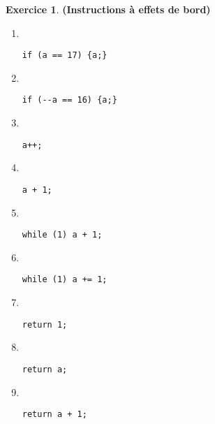 \documentclass[12pt]{article}
\theoremstyle{definition}
\newtheorem{Exercice}{Exercice}
\begin{document}
\begin{Exercice} {\bf (Instructions à effets de bord)}
\begin{enumerate}
\begin{multicols}{2}
\begin{enumerate}
            \item ~
\begin{lstlisting}
if (a == 17) {a;}
\end{lstlisting}
            \medskip

            \item ~
\begin{lstlisting}
if (--a == 16) {a;}
\end{lstlisting}
            \medskip

            \item ~
\begin{lstlisting}
a++;
\end{lstlisting}
            \medskip

            \item ~
\begin{lstlisting}
a + 1;
\end{lstlisting}
            \medskip

        \item ~
\begin{lstlisting}
while (1) a + 1;
\end{lstlisting}
            \medskip

        \item ~
\begin{lstlisting}
while (1) a += 1;
\end{lstlisting}
        \medskip
        
        \item ~
\begin{lstlisting}
return 1;
\end{lstlisting}
        \medskip

        \item ~
\begin{lstlisting}
return a;
\end{lstlisting}
        \medskip
        
        \item ~
\begin{lstlisting}
return a + 1;
\end{lstlisting}
        \medskip
        
        
    
        \end{enumerate}
    \end{multicols}
\end{enumerate}
\end{Exercice}
\bigskip
\end{document}
